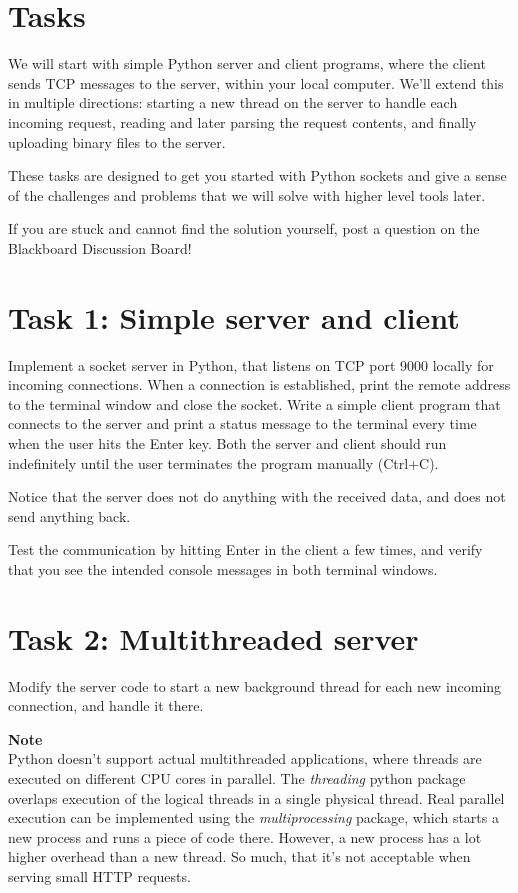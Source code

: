\section*{Tasks}
We will start with simple Python server and client programs, where the client sends TCP messages to the server, within your local computer. We’ll extend this in multiple directions: starting a new thread on the server to handle each incoming request, reading and later parsing the request contents, and finally uploading binary files to the server. 

These tasks are designed to get you started with Python sockets and give a sense of the challenges and problems that we will solve with higher level tools later.

If you are stuck and cannot find the solution yourself, post a question on the Blackboard Discussion Board!

\section*{Task 1: Simple server and client}

Implement a socket server in Python, that listens on TCP port 9000 locally for incoming connections. When a connection is established, print the remote address to the terminal window and close the socket.
Write a simple client program that connects to the server and print a status message to the terminal every time when the user hits the Enter key. 
Both the server and client should run indefinitely until the user terminates the program manually (Ctrl+C).

Notice that the server does not do anything with the received data, and does not send anything back.

Test the communication by hitting Enter in the client a few times, and verify that you see the intended console messages in both terminal windows.

\section*{Task 2: Multithreaded server}

Modify the server code to start a new background thread for each new incoming connection, and handle it there.

\begin{note}
\textbf{Note}\\
Python doesn’t support actual multithreaded applications, where threads are executed on different CPU cores in parallel. The \emph{threading} python package overlaps execution of the logical threads in a single physical thread. Real parallel execution can be implemented using the \emph{multiprocessing} package, which starts a new process and runs a piece of code there. However, a new process has a lot higher overhead than a new thread. So much, that it’s not acceptable when serving small HTTP requests.  
\end{note}

